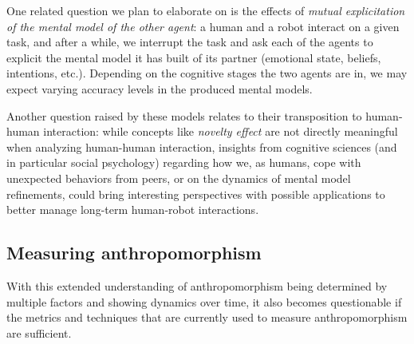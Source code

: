\documentclass{frontiersSCNS} %
\begin{document}
One related question we plan to elaborate on is the effects of \emph{mutual
explicitation of the mental model of the other agent}: a human and a robot
interact on a given task, and after a while, we interrupt the task and ask each
of the agents to explicit the mental model it has built of its partner
(emotional state, beliefs, intentions, etc.). Depending on the cognitive stages
the two agents are in, we may expect varying accuracy levels in the produced
mental models.

Another question raised by these models relates to their transposition to
human-human interaction: while concepts like \emph{novelty effect} are not
directly meaningful when analyzing human-human interaction, insights from
cognitive sciences (and in particular social psychology) regarding how we, as
humans, cope with unexpected behaviors from peers, or on the dynamics of mental
model refinements, could bring interesting perspectives with possible
applications to better manage long-term human-robot interactions.

\subsection{Measuring anthropomorphism}
\label{sec:measuring}


With this extended understanding of anthropomorphism being determined by multiple factors and showing dynamics over time, it also becomes questionable if the metrics and techniques that are currently used to measure anthropomorphism are sufficient.
\end{document}
